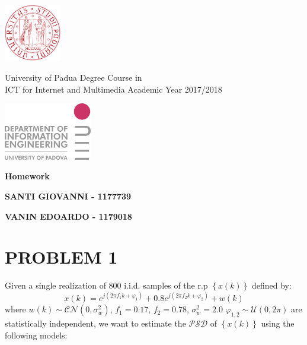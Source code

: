 \documentclass[a4paper,11pt,openright,twoside]{report}
\begin{document}
\begin{minipage}[b]{0.20\textwidth}    %
	\centering
	\includegraphics[height=2.5cm]{unipd}
\end{minipage}%
\begin{minipage}[b][2cm]{0.6\textwidth}
	\centering\large \sc
	University of Padua \vfill
	Degree Course in \\ ICT for Internet and Multimedia\vfill
	\small Academic Year 2017/2018 \end{minipage}%
\begin{minipage}[b]{0.20\textwidth}
	\centering 
	\includegraphics[height=2.5cm]{dei}
\end{minipage}

\vspace*{20pt}
\begin{center}\leavevmode
	\normalfont
	{\huge\raggedleft \bfseries\textsf{  Homework}\par}%
	\hrulefill\par
	{\LARGE\raggedright \textsf{\bfseries SANTI GIOVANNI - 1177739}\par}%
	\vspace*{20pt}
	{\LARGE\raggedright \textsf{\bfseries VANIN EDOARDO - 1179018}\par}%
	\vspace*{20pt}
\end{center}	
	
\section*{PROBLEM 1}
Given a single realization of 800 i.i.d. samples of the r.p $ \left\lbrace x(k) \right\rbrace$ defined by:
\begin{equation*}
x(k) = e^{j(2 \pi f_1k+\varphi_1)}+0.8e^{j(2 \pi f_2k+\varphi_2)}+w(k)
\end{equation*}
where $w(k)\sim \mathcal{CN}(0,\sigma_w^2)$, $f_1=0.17$, $f_2 = 0.78$, $\sigma_w^2=2.0$ $\varphi_{1,2}\sim \mathcal{U}(0,2\pi)$ are statistically independent, we want to estimate the $\mathcal{PSD}$ of $ \left\lbrace x(k) \right\rbrace$ using the following models:
\end{document}
